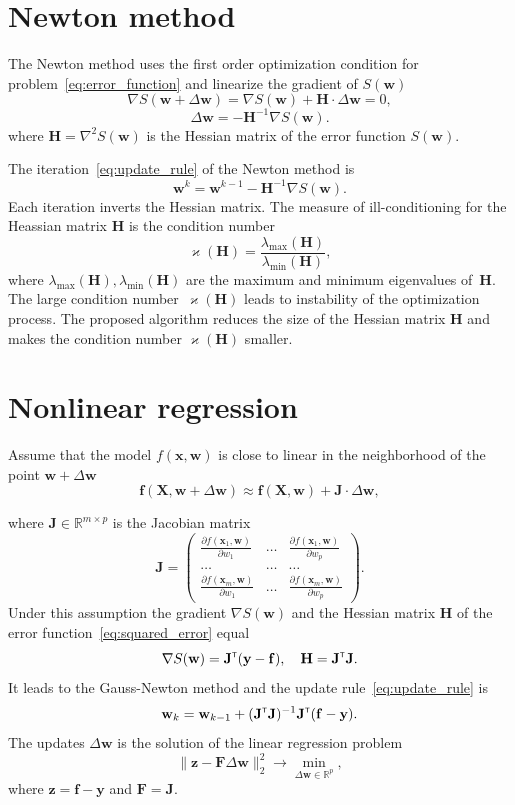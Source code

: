 \documentclass[a4paper,12pt]{article}
\renewcommand{\kappa}{\ensuremath{\varkappa}}
\theoremstyle{plain} %
\theoremstyle{definition} %
\theoremstyle{remark} %
\newcommand{\bw}{\mathbf{w}}
\newcommand{\by}{\mathbf{y}}
\newcommand{\bx}{\mathbf{x}}
\newcommand{\bz}{\mathbf{z}}
\newcommand{\bJ}{\mathbf{J}}
\newcommand{\bbR}{\mathbb{R}}
\newcommand{\bH}{\mathbf{H}}
\newcommand{\bF}{\mathbf{F}}
\newcommand{\bX}{\mathbf{X}}
\newcommand{\T}{{\text{\tiny\sffamily\upshape\mdseries T}}}
\begin{document}
	\section*{Newton method}
	
	The Newton method uses the first order optimization condition for problem~\eqref{eq:error_function} and linearize the gradient of $S(\bw)$
	\[
		\nabla S (\bw + \Delta \bw) = \nabla S(\bw) + \bH \cdot \Delta \bw = 0,
	\]
	\[
		\Delta \bw = - \bH^{-1} \nabla S(\bw).
	\]
	where $\bH = \nabla^2 S(\bw)$ is the Hessian matrix of the error function $S(\bw)$.
	
	The iteration~\eqref{eq:update_rule} of the Newton method is
	\[
		\bw^k = \bw^{k-1} - \bH^{-1} \nabla S(\bw).
	\]
	Each iteration inverts the Hessian matrix.
	The measure of ill-conditioning for the Heassian matrix $\bH$ is the condition number
	\[
		\kappa(\bH) = \frac{\lambda_{\text{max}}(\bH)}{\lambda_{\text{min}}(\bH)},
	\]
	where $\lambda_{\text{max}}(\bH), \lambda_{\text{min}}(\bH)$ are the maximum and minimum eigenvalues of~$\bH$. The large condition number~$\kappa(\bH)$ leads to instability of the optimization process.
	The proposed algorithm reduces the size of the Hessian matrix $\bH$ and makes the condition number $\kappa(\bH)$ smaller.
	
	\section*{Nonlinear regression}
	Assume that the model $f(\bx , \bw)$ is close to linear in the neighborhood of the point $\bw + \Delta \bw$
	\[
	\mathbf{f}(\bX , \bw + \Delta \bw) \approx \mathbf{f}(\bX , \bw) + \bJ \cdot \Delta  \bw,
	\]
	
	where $\mathbf{J} \in \bbR^{m \times p}$ is the Jacobian matrix
	\begin{equation}
		\bJ = 
		\begin{pmatrix}
		\frac{\partial f(\bx_1 , \bw)}{\partial w_1} & \dots & 
		\frac{\partial f(\bx_1 , \bw)}{\partial w_p} \\
		\dots & \dots & \dots \\
		\frac{\partial f(\bx_m , \bw)}{\partial w_1} & \dots & 
		\frac{\partial f(\bx_m , \bw)}{\partial w_p}
		\end{pmatrix}.
	\end{equation}
	Under this assumption the gradient $\nabla S(\bw)$ and the Hessian matrix $\bH$ of the error function~\eqref{eq:squared_error} equal
	\begin{equation}
		\nabla S(\bw) = \bJ^{\T} (\by - \mathbf{f}), \quad \bH = \bJ^{\T} \bJ.
		\label{eq:nonlin_reg_deriv}
	\end{equation}
	It leads to the Gauss-Newton method and the update rule~\eqref{eq:update_rule} is 
	\[
		\bw_k = \bw_{k - 1} + (\bJ^{\T} \bJ)^{-1}\bJ^{\T}(\mathbf{f} - \by).
	\]
	The updates $\Delta \bw$ is the solution of the linear regression problem
	\begin{equation}
		\| \bz - \bF \Delta \bw \|_2^2 \rightarrow \min_{\Delta \bw \in \bbR^{p}},
		\label{eq:lin_reg_nonlin_reg}
	\end{equation}
	where $\bz = \mathbf{f} - \by$ and $\bF = \bJ$.
	
\end{document}
